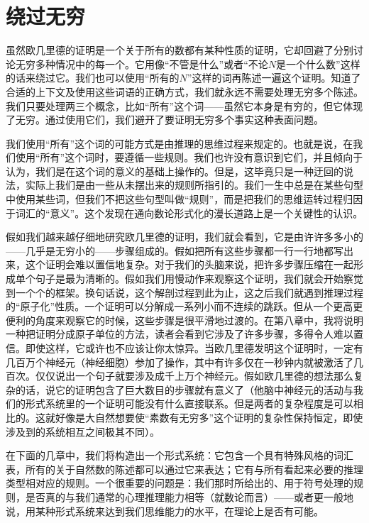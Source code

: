 \section{绕过无穷}

虽然欧几里德的证明是一个关于所有的数都有某种性质的证明，它却回避了分别讨论无穷多种情况中的每一个。它用像“不管是什么”或者“不论$N$是一个什么数”这样的话来绕过它。我们也可以使用“所有的$N$”这样的词再陈述一遍这个证明。知道了合适的上下文及使用这些词语的正确方式，我们就永远不需要处理无穷多个陈述。我们只要处理两三个概念，比如“所有”这个词——虽然它本身是有穷的，但它体现了无穷。通过使用它们，我们避开了要证明无穷多个事实这种表面问题。

我们使用“所有”这个词的可能方式是由推理的思维过程来规定的。也就是说，在我们使用“所有”这个词时，要遵循一些规则。我们也许没有意识到它们，并且倾向于认为，我们是在这个词的意义的基础上操作的。但是，这毕竟只是一种迂回的说法，实际上我们是由一些从未摆出来的规则所指引的。我们一生中总是在某些句型中使用某些词，但我们不把这些句型叫做“规则”，而是把我们的思维运转过程归因于词汇的“意义”。这个发现在通向数论形式化的漫长道路上是一个关键性的认识。

假如我们越来越仔细地研究欧几里德的证明，我们就会看到，它是由许许多多小的——几乎是无穷小的——步骤组成的。假如把所有这些步骤都一行一行地都写出来，这个证明会难以置信地复杂。对于我们的头脑来说，把许多步骤压缩在一起形成单个句子是最为清晰的。假如我们用慢动作来观察这个证明，我们就会开始察觉到一个个的框架。换句话说，这个解剖过程到此为止，这之后我们就遇到推理过程的“原子化”性质。一个证明可以分解成一系列小而不连续的跳跃。但从一个更高更便利的角度来观察它的时候，这些步骤是很平滑地过渡的。在第八章中，我将说明一种把证明分成原子单位的方法，读者会看到它涉及了许多步骤，多得令人难以置信。即使这样，它或许也不应该让你太惊异。当欧几里德发明这个证明时，一定有几百万个神经元（神经细胞）参加了操作，其中有许多仅在一秒钟内就被激活了几百次。仅仅说出一个句子就要涉及成千上万个神经元。假如欧几里德的想法那么复杂的话，说它的证明包含了巨大数目的步骤就有意义了（他脑中神经元的活动与我们的形式系统里的一个证明可能没有什么直接联系。但是两者的复杂程度是可以相比的。这就好像是大自然想要使“素数有无穷多”这个证明的复杂性保持恒定，即使涉及到的系统相互之间极其不同）。

在下面的几章中，我们将构造出一个形式系统：它包含一个具有特殊风格的词汇表，所有的关于自然数的陈述都可以通过它来表达；它有与所有看起来必要的推理类型相对应的规则。一个很重要的问题是：我们那时所给出的、用于符号处理的规则，是否真的与我们通常的心理推理能力相等（就数论而言）——或者更一般地说，用某种形式系统来达到我们思维能力的水平，在理论上是否有可能。
